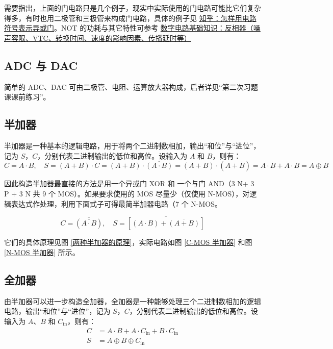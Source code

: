 \documentclass[UTF8]{report}
\theoremstyle{MyLineTheoremStyle} %
\theoremstyle{MyBlockTheoremStyle} %
\theoremstyle{MySubsubsectionStyle} %
\begin{document}
需要指出，上面的门电路只是几个例子，现实中实际使用的门电路可能比它们复杂得多，有时也用二极管和三极管来构成门电路，具体的例子见 \href{https://www.zhihu.com/question/36577129/answer/68096454}{知乎：怎样用电路符号表示异或门}。NOT 的功耗与其它特性可参考 \href{https://blog.csdn.net/vivid117/article/details/100083567}{数字电路基础知识：反相器（噪声容限、VTC、转换时间、速度的影响因素、传播延时等）}

\subsection{ADC 与 DAC}


简单的 ADC、DAC 可由二极管、电阻、运算放大器构成，后者详见“第二次习题课课前练习”。

\subsection{半加器}

半加器是一种基本的逻辑电路，用于将两个二进制数相加，输出“和位”与“进位”，记为 $S$，$C$，分别代表二进制输出的低位和高位。设输入为 $A$ 和 $B$，则有：
\begin{equation}
C = A \cdot B,\quad S = (A + B)\cdot \overline{C} = (A + B)\cdot \overline{(A \cdot B)} = (A + B)\cdot (\overline{A} + \overline{B})  = A\cdot \overline{B}  + \overline{A}\cdot B =  A \oplus B
\end{equation}

因此构造半加器最直接的方法是用一个异或门  XOR  和 一个与门 AND（3 N+ 3 P + 3 N 共 9 个 MOS）。如果要求使用的 MOS 尽量少（仅使用 N-MOS），对逻辑表达式作处理，利用下面式子可得最简半加器电路（7 个 N-MOS。

\begin{equation}
    C = \overline{(\overline{A\cdot B})},\quad S = \overline{\left[(A \cdot B) + \overline{(A + B)}\right]}
\end{equation}

它们的具体原理见图 \ref{两种半加器的原理}，实际电路如图 \ref{C-MOS 半加器} 和图 \ref{N-MOS 半加器} 所示。

\subsection{全加器}

由半加器可以进一步构造全加器，全加器是一种能够处理三个二进制数相加的逻辑电路，输出“和位”与“进位”，记为 $S$，$C$，分别代表二进制输出的低位和高位。设输入为 $A$、$B$ 和 $C_{\text{in}}$，则有：
\begin{equation}
\begin{aligned}
    C &= A \cdot B + A \cdot C_{\text{in}} + B \cdot C_{\text{in}}\\
    S &= A \oplus B \oplus C_{\text{in}}
\end{aligned}
\end{equation}
\end{document}
